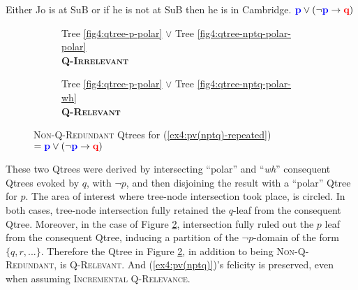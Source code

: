 \begin{exe}
	 {Either Jo is at SuB or if he is not at SuB then he is in Cambridge. $\textbf{\textcolor{blue}{p}} \vee (\neg \textbf{\textcolor{blue}{p}} \rightarrow \textbf{\textcolor{red}{q}})$}
\end{exe}

\begin{figure}[H]\setlength{\fboxsep}{2pt}
	\centering
	\begin{subfigure}[b]{.45\linewidth}
		\centering
		\caption[]{Tree \ref{fig4:qtree-p-polar} $\vee$ Tree \ref{fig4:qtree-nptq-polar-polar}\\
		\textbf{\textsc{Q-Irrelevant}}}\label{fig6:qtree-pv(nptq)-polar-polar}
	\end{subfigure}\hfill
	\begin{subfigure}[b]{.45\linewidth}
		\centering
		\scalebox{1}{
			\begin{forest}
				[CS [{\fbox{$\p$}}][{$\neg \p$} [\fbox{$\q$}][$\r$][...]]]
				\draw[color=black, dashed](.6,-2.2) circle (1.2);
			\end{forest}
		}
		\caption[]{Tree \ref{fig4:qtree-p-polar} $\vee$ Tree \ref{fig4:qtree-nptq-polar-wh}\\
		\textbf{\textsc{Q-Relevant}}}\label{fig6:qtree-pv(nptq)-polar-wh}
	\end{subfigure}\hfill
	\caption[]{\textsc{Non-Q-Redundant} Qtrees for (\ref{ex4:pv(nptq)-repeated}) $= \textbf{\textcolor{blue}{p}} \vee (\neg \textbf{\textcolor{blue}{p}} \rightarrow \textbf{\textcolor{red}{q}})$}\label{fig6:qtrees-pv(nptq)}
\end{figure}

These two Qtrees were derived by intersecting ``polar'' and ``\textit{wh}'' consequent Qtrees evoked by $q$, with $\neg p$, and then disjoining the result with a ``polar'' Qtree for $p$. The area of interest where tree-node intersection took place, is circled. In both cases, tree-node intersection fully retained the $q$-leaf from the consequent Qtree. Moreover, in the case of Figure \ref{fig6:qtree-pv(nptq)-polar-wh}, intersection fully ruled out the $p$ leaf from the consequent Qtree, inducing a partition of the $\neg p$-domain of the form $\lbrace q, r, ...\rbrace$. Therefore the Qtree in Figure \ref{fig6:qtree-pv(nptq)-polar-wh}, in addition to being \textsc{Non-Q-Redundant}, is \textsc{Q-Relevant}. And (\ref{ex4:pv(nptq)})'s felicity is preserved, even when assuming \textsc{Incremental Q-Relevance}.\\

